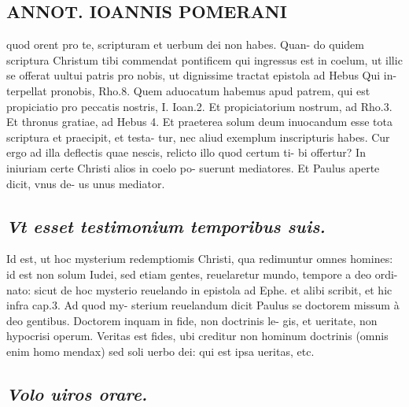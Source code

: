 \documentclass{article}
\begin{document}
\begin{pages}
\section*{ANNOT. IOANNIS POMERANI }\pstart quod orent pro te, scripturam et uerbum dei non habes. Quan- do quidem scriptura Christum tibi commendat pontificem qui ingressus est in coelum, ut illic se offerat uultui patris pro nobis, ut dignissime tractat epistola ad Hebus  Qui in- terpellat pronobis, Rho.8. Quem aduocatum habemus apud patrem, qui est propiciatio pro peccatis nostris, I. Ioan.2. Et propiciatorium nostrum, ad Rho.3. Et thronus gratiae, ad Hebus 4. Et praeterea solum deum inuocandum esse tota scriptura et praecipit, et testa- tur, nec aliud exemplum inscripturis habes. Cur ergo ad illa deflectis quae nescis, relicto illo quod certum ti- bi offertur? In iniuriam certe Christi alios in coelo po- suerunt mediatores. Et Paulus aperte dicit, vnus de- us unus mediator.  \pend
{}
{}
\subsection*{\textit{Vt esset testimonium temporibus suis. }}\pstart Id est, ut hoc mysterium redemptiomis Christi, qua redimuntur omnes homines: id est non solum Iudei, sed etiam gentes, reuelaretur mundo, tempore a deo ordi- nato: sicut de hoc mysterio reuelando in epistola ad Ephe. et alibi scribit, et hic infra cap.3. Ad quod my- sterium reuelandum dicit Paulus se doctorem missum à deo gentibus. Doctorem inquam in fide, non doctrinis le- gis, et ueritate, non hypocrisi operum. Veritas est fides, ubi creditur non hominum doctrinis (omnis enim homo mendax) sed soli uerbo dei: qui est ipsa ueritas, etc.  \pend
{}
{}
\subsection*{\textit{Volo uiros orare. }}

\end{pages}
\end{document}
